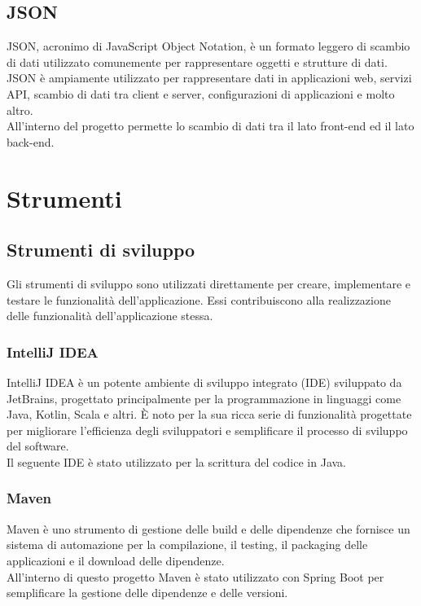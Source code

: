 \subsection*{JSON}
JSON, acronimo di JavaScript Object Notation, è un formato leggero di scambio di dati utilizzato comunemente per rappresentare oggetti e strutture di dati.
JSON è ampiamente utilizzato per rappresentare dati in applicazioni web, servizi API, scambio di dati tra client e server, configurazioni di applicazioni e molto altro.\\
All'interno del progetto permette lo scambio di dati tra il lato front-end ed il lato back-end.
\\

\section{Strumenti}
\subsection{Strumenti di sviluppo}
Gli strumenti di sviluppo sono utilizzati direttamente per creare, implementare e testare le funzionalità dell'applicazione. Essi contribuiscono alla realizzazione delle funzionalità dell'applicazione stessa.\\

\subsubsection*{IntelliJ IDEA}
IntelliJ IDEA è un potente ambiente di sviluppo integrato (IDE) sviluppato da JetBrains, progettato principalmente per la programmazione in linguaggi come Java, Kotlin, Scala e altri.
È noto per la sua ricca serie di funzionalità progettate per migliorare l'efficienza degli sviluppatori e semplificare il processo di sviluppo del software.\\
Il seguente IDE è stato utilizzato per la scrittura del codice in Java.\\

\subsubsection*{Maven}
Maven è uno strumento di gestione delle build e delle dipendenze che fornisce un sistema di automazione per la compilazione, il testing, il packaging delle applicazioni e il download delle dipendenze.\\
All'interno di questo progetto Maven è stato utilizzato con Spring Boot per semplificare la gestione delle dipendenze e delle versioni.
\\


